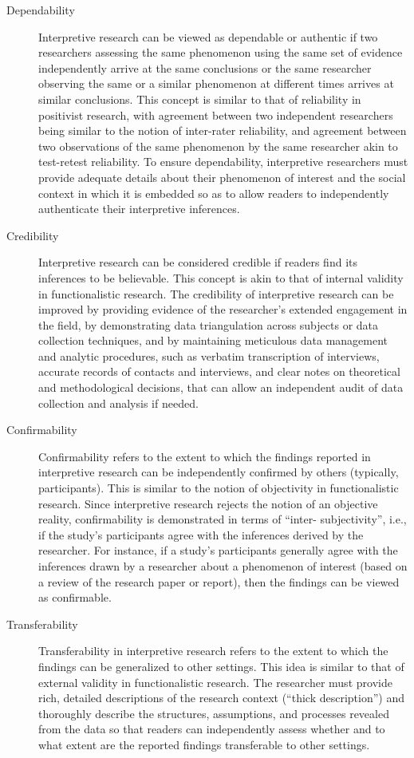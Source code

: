 \begin{description}
	\item[Dependability] Interpretive research can be viewed as dependable or authentic if two researchers assessing the same phenomenon using the same set of evidence independently arrive at the same conclusions or the same researcher observing the same or a similar phenomenon at different times arrives at similar conclusions. This concept is similar to that of reliability in positivist research, with agreement between two independent researchers being similar to the notion of inter-rater reliability, and agreement between two observations of the same phenomenon by the same researcher akin to test-retest reliability. To ensure dependability, interpretive researchers must provide adequate details about their phenomenon of interest and the social context in which it is embedded so as to allow readers to independently authenticate their interpretive inferences.

	\item[Credibility] Interpretive research can be considered credible if readers find its inferences to be believable. This concept is akin to that of internal validity in functionalistic research. The credibility of interpretive research can be improved by providing evidence of the researcher's extended engagement in the field, by demonstrating data triangulation across subjects or data collection techniques, and by maintaining meticulous data management and analytic procedures, such as verbatim transcription of interviews, accurate records of contacts and interviews, and clear notes on theoretical and methodological decisions, that can allow an independent audit of data collection and analysis if needed.

	\item[Confirmability] Confirmability refers to the extent to which the findings reported in interpretive research can be independently confirmed by others (typically, participants). This is similar to the notion of objectivity in functionalistic research. Since interpretive research rejects the notion of an objective reality, confirmability is demonstrated in terms of ``inter- subjectivity'', i.e., if the study's participants agree with the inferences derived by the researcher. For instance, if a study's participants generally agree with the inferences drawn by a researcher about a phenomenon of interest (based on a review of the research paper or report), then the findings can be viewed as confirmable.

	\item[Transferability] Transferability in interpretive research refers to the extent to which the findings can be generalized to other settings. This idea is similar to that of external validity in functionalistic research. The researcher must provide rich, detailed descriptions of the research context (``thick description'') and thoroughly describe the structures, assumptions, and processes revealed from the data so that readers can independently assess whether and to what extent are the reported findings transferable to other settings.
	
\end{description}

